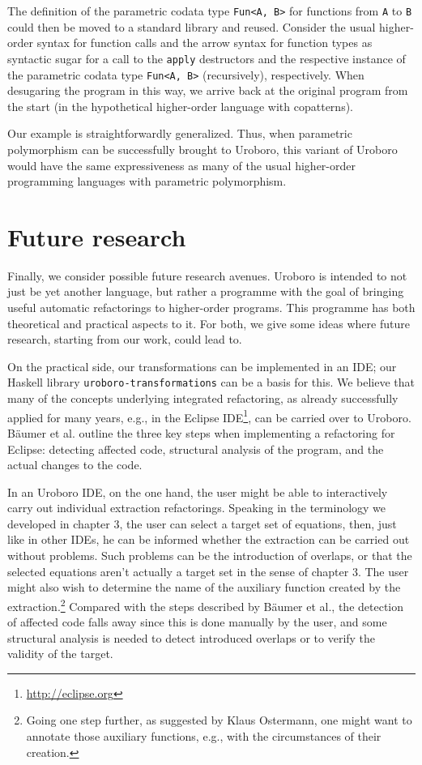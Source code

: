 The definition of the parametric codata type \texttt{Fun<A, B>} for functions from \texttt{A} to \texttt{B} could then be moved to a standard library and reused. Consider the usual higher-order syntax for function calls and the arrow syntax for function types as syntactic sugar for a call to the \texttt{apply} destructors and the respective instance of the parametric codata type \texttt{Fun<A, B>} (recursively), respectively. When desugaring the program in this way, we arrive back at the original program from the start (in the hypothetical higher-order language with copatterns).

Our example is straightforwardly generalized. Thus, when parametric polymorphism can be successfully brought to Uroboro, this variant of Uroboro would have the same expressiveness as many of the usual higher-order programming languages with parametric polymorphism.

\section{Future research}
\label{sec:futr}

Finally, we consider possible future research avenues. Uroboro is intended to not just be yet another language, but rather a programme with the goal of bringing useful automatic refactorings to higher-order programs. This programme has both theoretical and practical aspects to it. For both, we give some ideas where future research, starting from our work, could lead to.

On the practical side, our transformations can be implemented in an IDE; our Haskell library \texttt{uroboro-transformations} can be a basis for this. We believe that many of the concepts underlying integrated refactoring, as already successfully applied for many years, e.g., in the Eclipse IDE\footnote{\url{http://eclipse.org}}, can be carried over to Uroboro. Bäumer et al.\cite{baumer2001integrating} outline the three key steps when implementing a refactoring for Eclipse: detecting affected code, structural analysis of the program, and the actual changes to the code.

In an Uroboro IDE, on the one hand, the user might be able to interactively carry out individual extraction refactorings. Speaking in the terminology we developed in chapter 3, the user can select a target set of equations, then, just like in other IDEs, he can be informed whether the extraction can be carried out without problems. Such problems can be the introduction of overlaps, or that the selected equations aren't actually a target set in the sense of chapter 3. The user might also wish to determine the name of the auxiliary function created by the extraction.\footnote{Going one step further, as suggested by Klaus Ostermann, one might want to annotate those auxiliary functions, e.g., with the circumstances of their creation.} Compared with the steps described by Bäumer et al., the detection of affected code falls away since this is done manually by the user, and some structural analysis is needed to detect introduced overlaps or to verify the validity of the target.

